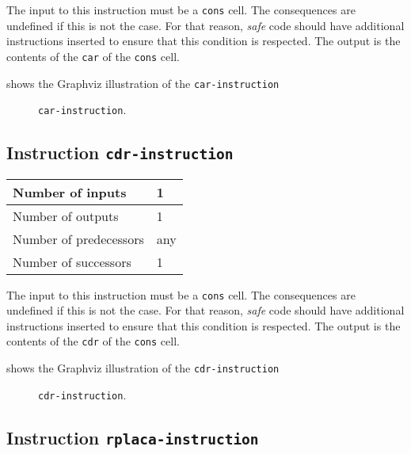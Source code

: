 The input to this instruction must be a \texttt{cons} cell. The
consequences are undefined if this is not the case.  For that reason,
\emph{safe} code should have additional instructions inserted to
ensure that this condition is respected.  The output is the contents
of the \texttt{car} of the \texttt{cons} cell.

 shows the Graphviz illustration of the
\texttt{car-instruction}

\begin{figure}
\begin{center}
\end{center}
\caption{\label{fig-car-instruction}
\texttt{car-instruction}.}
\end{figure}

\subsection{Instruction \texttt{cdr-instruction}}
\label{mir-instruction-cdr}

\begin{tabular}{|l|l|}
\hline
Number of inputs & 1\\
\hline
Number of outputs & 1\\
\hline
Number of predecessors & any\\
\hline
Number of successors & 1\\
\hline
\end{tabular}

The input to this instruction must be a \texttt{cons} cell. The
consequences are undefined if this is not the case.  For that reason,
\emph{safe} code should have additional instructions inserted to
ensure that this condition is respected.  The output is the contents
of the \texttt{cdr} of the \texttt{cons} cell.

 shows the Graphviz illustration of the
\texttt{cdr-instruction}

\begin{figure}
\begin{center}
\end{center}
\caption{\label{fig-cdr-instruction}
\texttt{cdr-instruction}.}
\end{figure}

\subsection{Instruction \texttt{rplaca-instruction}}
\label{mir-instruction-rplaca}

